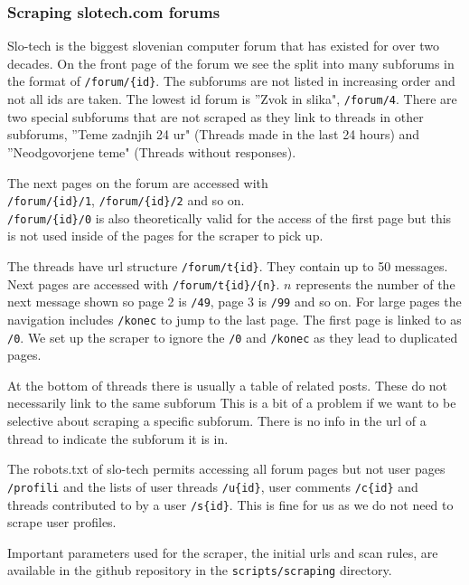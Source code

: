 \documentclass[fleqn,moreauthors,10pt]{ds_report}
\begin{document}
\subsubsection*{Scraping slo\-tech.com forums}\label{sssection:sloforum}

Slo-tech is the biggest slovenian computer forum that has existed for over two decades. On the front page of the forum we see the split into many subforums in the format of \texttt{/forum/\{id\}}. The subforums are not listed in increasing order and not all ids are taken. The lowest id forum is ''Zvok in slika", \texttt{/forum/4}. There are two special subforums that are not scraped as they link to threads in other subforums, ''Teme zadnjih 24 ur" (Threads made in the last 24 hours) and ''Neodgovorjene teme" (Threads without responses).

The next pages on the forum are accessed with \\ \texttt{/forum/\{id\}/1}, \texttt{/forum/\{id\}/2} and so on. \\ \texttt{/forum/\{id\}/0} is also theoretically valid for the access of the first page but this is not used inside of the pages for the scraper to pick up.

The threads have url structure \texttt{/forum/t\{id\}}. They contain up to 50 messages. Next pages are accessed with \texttt{/forum/t\{id\}/\{n\}}. $n$ represents the number of the next message shown so page 2 is \texttt{/49}, page 3 is \texttt{/99} and so on. For large pages the navigation includes \texttt{/konec} to jump to the last page. The first page is linked to as \texttt{/0}. We set up the scraper to ignore the \texttt{/0} and \texttt{/konec} as they lead to duplicated pages.

At the bottom of threads there is usually a table of related posts. These do not necessarily link to the same subforum This is a bit of a problem if we want to be selective about scraping a specific subforum. There is no info in the url of a thread to indicate the subforum it is in.

The robots.txt of slo-tech permits accessing all forum pages but not user pages \texttt{/profili} and the lists of user threads \texttt{/u\{id\}}, user comments \texttt{/c\{id\}} and threads contributed to by a user \texttt{/s\{id\}}. This is fine for us as we do not need to scrape user profiles.

Important parameters used for the scraper, the initial urls and scan rules, are available in the github repository in the \texttt{scripts/scraping} directory.
\end{document}
